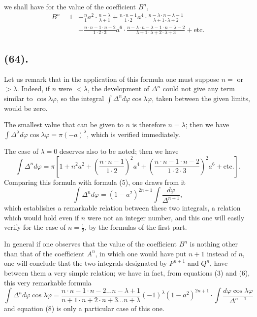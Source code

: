 \documentclass{article}
\begin{document}
we shall have for the value of the coefficient $B^{n}$,
\[ \begin{aligned} B^{n}=1&+\frac{n}{1}a^{2}\cdot\frac{n-\lambda}{\lambda+1}+\frac{n\cdot n-1}{1\cdot2}a^{4}\cdot\frac{n-\lambda\cdot n-\lambda-1}{\lambda+1\cdot\lambda+2}\\ &+\frac{n\cdot n-1\cdot n-2}{1\cdot2\cdot3}a^{6}\cdot\frac{n-\lambda\cdot n-\lambda-1\cdot n-\lambda-2}{\lambda+1\cdot\lambda+2\cdot\lambda+3}+\text{etc.} \end{aligned} \tag{6} \]

\subsection*{(64).}

Let us remark that in the application of this formula one must suppose $n=$ or $>\lambda$. Indeed, if $n$ were $<\lambda$, the development of $\Delta^{n}$ could not give any term similar to $\cos\lambda\varphi$, so the integral $\displaystyle\int\Delta^{n}d\varphi\cos\lambda\varphi$, taken between the given limits, would be zero.

The smallest value that can be given to $n$ is therefore $n=\lambda$; then we have $\displaystyle\int\Delta^{\lambda}d\varphi\cos\lambda\varphi=\pi(-a)^{\lambda}$, which is verified immediately.

The case of $\lambda=0$ deserves also to be noted; then we have
\[ \int\Delta^{n}d\varphi=\pi\left[1+n^{2}a^{2}+\left(\frac{n\cdot n-1}{1\cdot2}\right)^{2}a^{4}+\left(\frac{n\cdot n-1\cdot n-2}{1\cdot2\cdot3}\right)^{2}a^{6}+\text{etc.}\right]. \tag{7} \]
Comparing this formula with formula (5), one draws from it
\[ \int\Delta^{n}d\varphi=(1-a^{2})^{2n+1}\int\frac{d\varphi}{\Delta^{n+1}}, \tag{8} \]
which establishes a remarkable relation between these two integrals, a relation which would hold even if $n$ were not an integer number, and this one will easily verify for the case of $n=\frac{1}{2}$, by the formulas of the first part.

In general if one observes that the value of the coefficient $B^{n}$ is nothing other than that of the coefficient $A^{n}$, in which one would have put $n+1$ instead of $n$, one will conclude that the two integrals designated by $P^{n+1}$ and $Q^{n}$, have between them a very simple relation; we have in fact, from equations (3) and (6), this very remarkable formula
\[ \int\Delta^{n}d\varphi\cos\lambda\varphi=\frac{n\cdot n-1\cdot n-2\ldots n-\lambda+1}{n+1\cdot n+2\cdot n+3\ldots n+\lambda}(-1)^{\lambda}(1-a^{2})^{2n+1}\cdot\int\frac{d\varphi\cos\lambda\varphi}{\Delta^{n+1}} \]
and equation (8) is only a particular case of this one.
\end{document}
